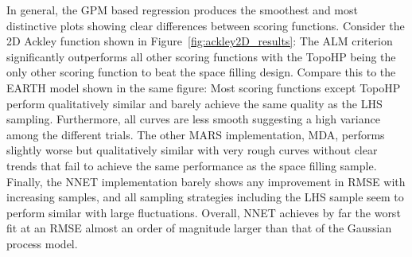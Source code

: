 In general, the GPM based regression produces the smoothest and most distinctive plots showing clear differences between scoring functions.
%
Consider the 2D Ackley function shown in Figure~\ref{fig:ackley2D_results}: The ALM criterion significantly outperforms all other scoring functions with the TopoHP being the only other scoring function to beat the space filling design.
%
Compare this to the EARTH model shown in the same figure: Most scoring functions except TopoHP perform qualitatively similar and barely achieve the same quality as the LHS sampling.
%
Furthermore, all curves are less smooth suggesting a high variance among the different trials.
%
The other MARS implementation, MDA, performs slightly worse but qualitatively similar with very rough curves without clear trends that fail to achieve the same performance as the space filling sample.
%
Finally, the NNET implementation barely shows any improvement in RMSE with increasing samples, and all sampling strategies including the LHS sample seem to perform similar with large fluctuations.
%
Overall, NNET achieves by far the worst fit at an RMSE almost an order of magnitude larger than that of the Gaussian process model.
